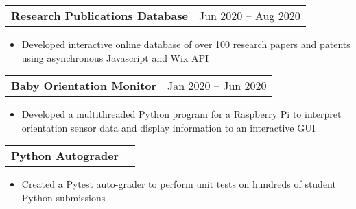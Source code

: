 \documentclass[a4paper,10pt]{article}
\begin{document}
\begin{tabularx}{\linewidth}{@{}X r@{}}
\begin{minipage}[t]{\linewidth}
  \textbf{Research Publications Database}
\end{minipage}
&     Jun 2020 -- Aug 2020
\end{tabularx}
\begin{itemize}[nosep,after=\strut, leftmargin=1em, itemsep=3pt,label=--]
  \item Developed interactive online database of over 100 research papers and patents using asynchronous Javascript and Wix API
\end{itemize}
\begin{tabularx}{\linewidth}{@{}X r@{}}
\begin{minipage}[t]{\linewidth}
  \textbf{Baby Orientation Monitor}
\end{minipage}
&     Jan 2020 -- Jun 2020
\end{tabularx}
\begin{itemize}[nosep,after=\strut, leftmargin=1em, itemsep=3pt,label=--]
  \item Developed a multithreaded Python program for a Raspberry Pi to interpret orientation sensor data and display information to an interactive GUI
\end{itemize}
\begin{tabularx}{\linewidth}{@{}X r@{}}
\begin{minipage}[t]{\linewidth}
  \textbf{Python Autograder}
\end{minipage}
&     
\end{tabularx}
\begin{itemize}[nosep,after=\strut, leftmargin=1em, itemsep=3pt,label=--]
  \item Created a Pytest auto-grader to perform unit tests on hundreds of student Python submissions
\end{itemize}
\end{document}
